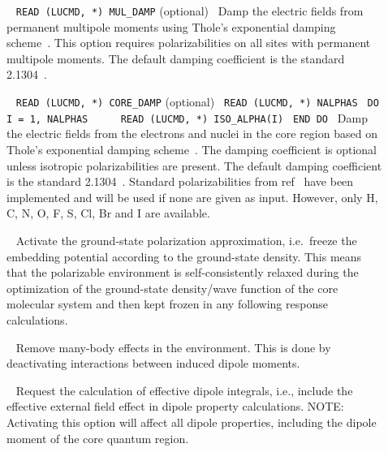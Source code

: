 \begin{description}
\item[]\verb| |\newline
\verb|READ (LUCMD, *) MUL_DAMP| (optional)\verb| |\newline
Damp the electric fields from permanent multipole moments using Thole's exponential damping scheme~\cite{thole_damp_1,thole_damp_2}. This option requires polarizabilities on all sites with permanent multipole moments. The default damping coefficient is the standard 2.1304~\cite{thole_damp_2}.

\item[]\verb| |\newline
\verb|READ (LUCMD, *) CORE_DAMP| (optional)\verb| |\newline
\verb|READ (LUCMD, *) NALPHAS|\verb| |\newline
\verb|DO I = 1, NALPHAS|\verb| |\newline
\verb|    READ (LUCMD, *) ISO_ALPHA(I)|\verb| |\newline
\verb|END DO|\verb| |\newline
Damp the electric fields from the electrons and nuclei in the core region based on Thole's exponential damping scheme~\cite{thole_damp_1,thole_damp_2}. The damping coefficient is optional unless isotropic polarizabilities are present. The default damping coefficient is the standard 2.1304~\cite{thole_damp_2}. Standard polarizabilities from ref~ have been implemented and will be used if none are given as input. However, only H, C, N, O, F, S, Cl, Br and I are available.

\item[]\verb| |\newline
Activate the ground-state polarization approximation, i.e.\ freeze the embedding potential according to the ground-state density. This means that the polarizable environment is self-consistently relaxed during the optimization of the ground-state density/wave function of the core molecular system and then kept frozen in any following response calculations.

\item[]\verb| |\newline
Remove many-body effects in the environment. This is done by deactivating interactions between induced dipole moments.

\item[]\verb| |\newline
Request the calculation of effective dipole integrals, i.e.,
include the effective external field effect in dipole property calculations.
NOTE: Activating this option will affect all dipole properties, including the dipole moment
of the core quantum region.


\end{description}

